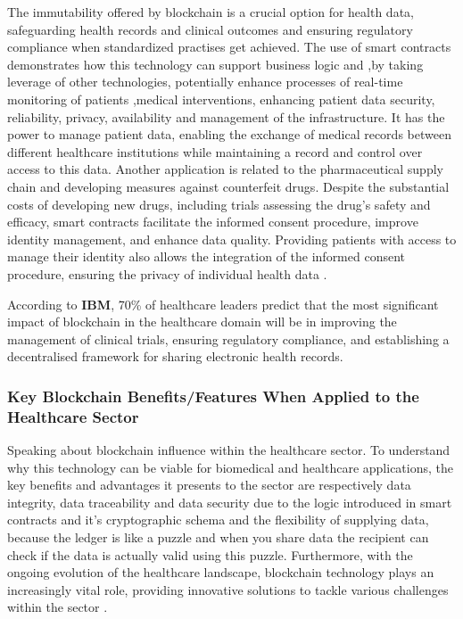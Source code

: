 The immutability offered by blockchain is a crucial option for health data, safeguarding health records and clinical outcomes and ensuring regulatory compliance when standardized practises get achieved. The use of smart contracts demonstrates how this technology can support business logic and ,by taking leverage of other technologies, potentially enhance processes of real-time monitoring of patients ,medical interventions, enhancing patient data security, reliability, privacy, availability and management of the infrastructure. It has the power to manage patient data, enabling the exchange of medical records between different healthcare institutions while maintaining a record and control over access to this data. Another application is related to the pharmaceutical supply chain and developing measures against counterfeit drugs. Despite the substantial costs of developing new drugs, including trials assessing the drug's safety and efficacy, smart contracts facilitate the informed consent procedure, improve identity management, and enhance data quality. Providing patients with access to manage their identity also allows the integration of the informed consent procedure, ensuring the privacy of individual health data \cite{blockchain-in-healthcare-2}.

According to \textbf{IBM}, 70\% of healthcare leaders predict that the most significant impact of blockchain in the healthcare domain will be in improving the management of clinical trials, ensuring regulatory compliance, and establishing a decentralised framework for sharing electronic health records.

\subsubsection{Key Blockchain Benefits/Features When Applied to the Healthcare Sector}
Speaking about blockchain influence within the healthcare sector. To understand why this technology can be viable for biomedical and healthcare applications, the key benefits and advantages it presents to the sector are respectively data integrity, data traceability and data security due to the logic introduced in smart contracts and it's cryptographic schema and the flexibility of supplying data, because the ledger is like a puzzle and when you share data the recipient can check if the data is actually valid using this puzzle. Furthermore, with the ongoing evolution of the healthcare landscape, blockchain technology plays an increasingly vital role, providing innovative solutions to tackle various challenges within the sector \cite{blockchain-distributed-ledger-biomedical} \cite{blockchain-research-challenges}.

